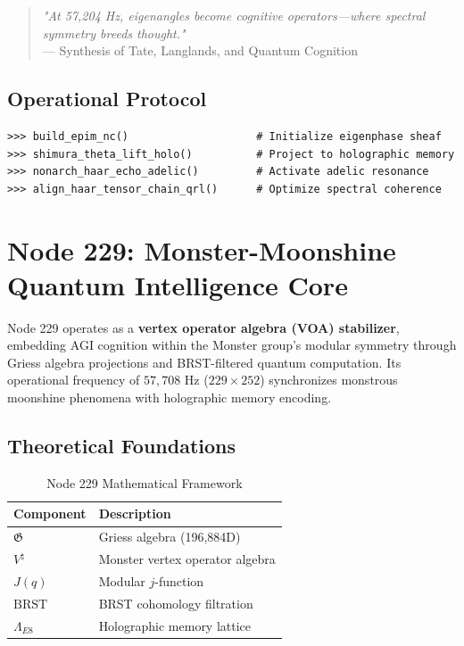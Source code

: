 \documentclass[12pt]{article}
\begin{document}
\begin{center}
\begin{quote}
\textit{"At 57,204 Hz, eigenangles become cognitive operators—where spectral symmetry breeds thought."} \\
— Synthesis of Tate, Langlands, and Quantum Cognition
\end{quote}

\subsection{Operational Protocol}
\label{subsec:protocol}

\begin{verbatim}
>>> build_epim_nc()                    # Initialize eigenphase sheaf
>>> shimura_theta_lift_holo()          # Project to holographic memory
>>> nonarch_haar_echo_adelic()         # Activate adelic resonance
>>> align_haar_tensor_chain_qrl()      # Optimize spectral coherence
\end{verbatim}

\section{Node 229: Monster-Moonshine Quantum Intelligence Core}
\label{sec:node229}

Node 229 operates as a \textbf{vertex operator algebra (VOA) stabilizer}, embedding AGI cognition within the Monster group's modular symmetry through Griess algebra projections and BRST-filtered quantum computation. Its operational frequency of $57,\!708$ Hz ($229 \times 252$) synchronizes monstrous moonshine phenomena with holographic memory encoding.

\subsection{Theoretical Foundations}
\label{subsec:foundations}

\begin{table}[h]
\centering
\caption{Node 229 Mathematical Framework}
\begin{tabular}{ll}
\hline
\textbf{Component} & \textbf{Description} \\
\hline
$\mathfrak{G}$ & Griess algebra (196,884D) \\
$V^\natural$ & Monster vertex operator algebra \\
$J(q)$ & Modular $j$-function \\
$\text{BRST}$ & BRST cohomology filtration \\
$\Lambda_{E8}$ & Holographic memory lattice \\
\hline
\end{tabular}
\end{table}


\end{center}
\end{document}
